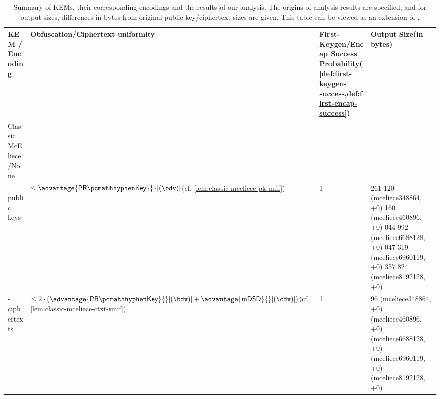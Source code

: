 \begin{table}
    \centering
    \tiny\raggedright
    \begin{tabular}{@{} L{0.2\textwidth-\tabcolsep} | L{0.35\tabcolsep} L{0.2\tabcolsep} L{0.25\textwidth-\tabcolsep} @{}}
        \textbf{KEM /\newline Encoding} & \textbf{Obfuscation/Ciphertext uniformity} & \textbf{First-Keygen/Encap Success Probability}\newline (\cref{def:first-keygen-success,def:first-encap-success}) & \textbf{Output Size}\newline (in bytes)\\ \hline
        Classic McEliece \cite{NISTPQC-R4:ClassicMcEliece22} /\newline None & \rule{0pt}{1.2em} &  & \\
        - public keys & $\leq \advantage{\prkey}{}[(\bdv)]$\newline (cf. \cref{lem:classic-mceliece-pk-unif})
         & 1
         & 261 120 (\textsf{mceliece348864}, +0) 160 (\textsf{mceliece460896}, +0) 044 992 (\textsf{mceliece6688128}, +0) 047 319 (\textsf{mceliece6960119}, +0) 357 824 (\textsf{mceliece8192128}, +0)\newline \\
        - ciphertexts & $\leq 2 \cdot \left( \advantage{\prkey}{}[(\bdv)] + \advantage{\mdsd}{}[(\cdv)] \right)$\newline (cf. \cref{lem:classic-mceliece-ctxt-unif})
         & 1
         & 96 (\textsf{mceliece348864}, +0) (\textsf{mceliece460896}, +0) (\textsf{mceliece6688128}, +0) (\textsf{mceliece6960119}, +0) (\textsf{mceliece8192128}, +0)\newline \\
    \end{tabular}
    \caption{Summary of KEMs, their corresponding encodings and the results of our analysis. The origins of analysis results are specified, and for output sizes, differences in bytes from original public key/ciphertext sizes are given. This table can be viewed as an extension of \cite[Table~2]{CCS:GunSteVei24}.}
    \label{tab:obfuscation-summary}
\end{table}
